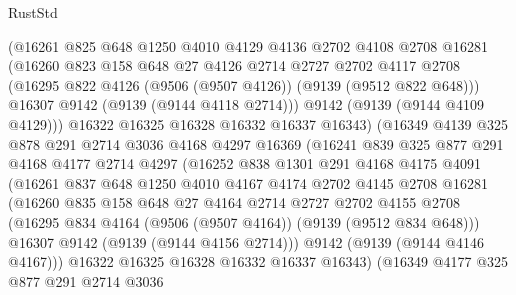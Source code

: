 \begin{lexlean}{RustStd}
\begin{coremodule}
              (@16261
                @825
                @648
                @1250
                @4010
                @4129
                @4136
                @2702
                @4108
                @2708
                @16281
                (@16260
                  @823
                  @158
                  @648
                  @27
                  @4126
                  @2714
                  @2727
                  @2702
                  @4117
                  @2708
                  (@16295 @822 @4126 (@9506 (@9507 @4126)) (@9139 (@9512 @822 @648)))
                  @16307
                  @9142
                  (@9139 (@9144 @4118 @2714)))
                @9142
                (@9139 (@9144 @4109 @4129)))
              @16322
              @16325
              @16328
              @16332
              @16337
              @16343)
            (@16349
              @4139
              @325
              @878
              @291
              @2714
              @3036
              @4168
              @4297
              @16369
              (@16241
                @839
                @325
                @877
                @291
                @4168
                @4177
                @2714
                @4297
                (@16252
                  @838
                  @1301
                  @291
                  @4168
                  @4175
                  @4091
                  (@16261
                    @837
                    @648
                    @1250
                    @4010
                    @4167
                    @4174
                    @2702
                    @4145
                    @2708
                    @16281
                    (@16260
                      @835
                      @158
                      @648
                      @27
                      @4164
                      @2714
                      @2727
                      @2702
                      @4155
                      @2708
                      (@16295 @834 @4164 (@9506 (@9507 @4164)) (@9139 (@9512 @834 @648)))
                      @16307
                      @9142
                      (@9139 (@9144 @4156 @2714)))
                    @9142
                    (@9139 (@9144 @4146 @4167)))
                  @16322
                  @16325
                  @16328
                  @16332
                  @16337
                  @16343)
                (@16349
                  @4177
                  @325
                  @877
                  @291
                  @2714
                  @3036

\end{coremodule}
\end{lexlean}
